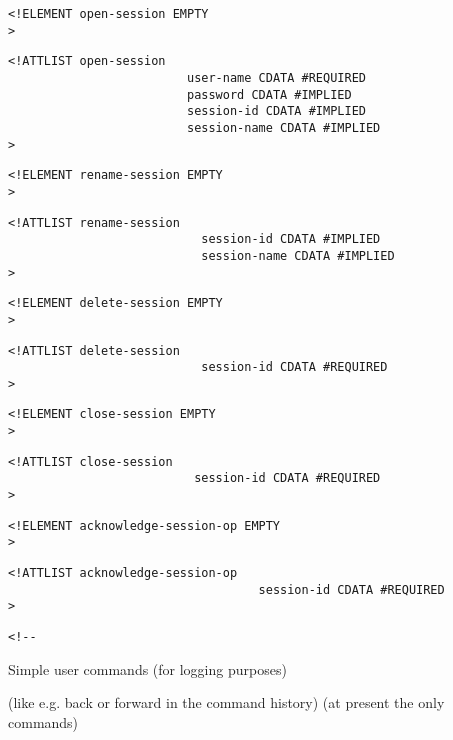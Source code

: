 \documentclass{article}
\begin{document}
\begin{verbatim}
<!ELEMENT open-session EMPTY 
>\end{verbatim}

\begin{verbatim}
<!ATTLIST open-session 
                         user-name CDATA #REQUIRED
                         password CDATA #IMPLIED
                         session-id CDATA #IMPLIED
                         session-name CDATA #IMPLIED
>\end{verbatim}

\begin{verbatim}
<!ELEMENT rename-session EMPTY 
>\end{verbatim}

\begin{verbatim}
<!ATTLIST rename-session 
                           session-id CDATA #IMPLIED
                           session-name CDATA #IMPLIED
>\end{verbatim}

\begin{verbatim}
<!ELEMENT delete-session EMPTY 
>\end{verbatim}

\begin{verbatim}
<!ATTLIST delete-session 
                           session-id CDATA #REQUIRED
>\end{verbatim}

\begin{verbatim}
<!ELEMENT close-session EMPTY 
>\end{verbatim}

\begin{verbatim}
<!ATTLIST close-session 
                          session-id CDATA #REQUIRED
>\end{verbatim}

\begin{verbatim}
<!ELEMENT acknowledge-session-op EMPTY 
>\end{verbatim}

\begin{verbatim}
<!ATTLIST acknowledge-session-op 
                                   session-id CDATA #REQUIRED
>\end{verbatim}

\begin{verbatim}<!--\end{verbatim}
  

     Simple user commands (for logging purposes)

     (like e.g. back or forward 
         in the command history)
     (at present the only commands)
      
\end{document}
